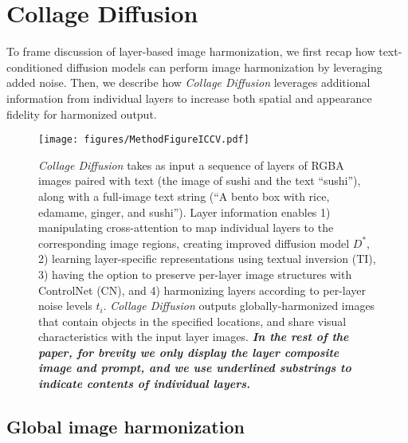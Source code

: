 \vspace{-0.5em}
\section{Collage Diffusion}
\vspace{-0.5em}

To frame discussion of layer-based image harmonization, we first recap how text-conditioned diffusion models can perform image harmonization by leveraging added noise. 
Then, we describe how \textit{Collage Diffusion} leverages additional information from individual layers to increase both spatial and appearance fidelity for harmonized output.
\vspace{-0.5em}

\begin{figure*}[!t]
    \centering
    \texttt{[image: figures/MethodFigureICCV.pdf]}
    \vspace{-1.5em}
    \caption{\textit{Collage Diffusion} takes as input a sequence of layers of RGBA images paired with text (the image of sushi and the text ``sushi''), along with a full-image text string (``A bento box with rice, edamame, ginger, and sushi''). Layer information enables 1) manipulating cross-attention to map individual layers to the corresponding image regions, creating improved diffusion model $D^*$, 2) learning layer-specific representations using textual inversion (TI), 3) having the option to preserve per-layer image structures with ControlNet (CN), and 4) harmonizing layers according to per-layer noise levels $t_i$. \textit{Collage Diffusion} outputs globally-harmonized images that contain objects in the specified locations, and share visual characteristics with the input layer images. 
	\textbf{\emph{In the rest of the paper, for brevity we only display the layer composite image and prompt, and we use underlined substrings to indicate contents of individual layers.}} }
    \label{fig:method}
\end{figure*}

\subsection{Global image harmonization} \label{method:SDEdit}
\vspace{-0.5em}


